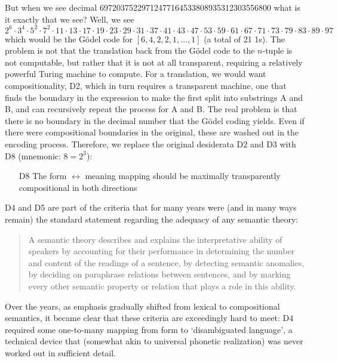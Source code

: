 \documentclass[output=paper,colorlinks=true,citecolor=brown]{langscibook}
\begin{document}
But when we see decimal 69720375229712477164533808935312303556800 what is it
exactly that we see? Well, we see $2^6\cdot 3^4\cdot 5^2\cdot 7^2\cdot 11\cdot
13\cdot 17\cdot 19\cdot 23\cdot 29\cdot 31\cdot 37\cdot 41\cdot 43\cdot
47\cdot 53\cdot 59\cdot 61\cdot 67\cdot 71\cdot 73\cdot 79\cdot 83\cdot
89\cdot 97$ which would be the G\"odel code for $[6,4,2,2,1,\ldots,1]$ (a
total of 21 1s). The problem is not that the translation back from the G\"odel
code to the $n$-tuple is not computable, but rather that it is not at all
transparent, requiring a relatively powerful Turing machine to compute. For a
translation, we would want compositionality, D2, which in turn requires a
transparent machine, one that finds the boundary in the expression to make the
first split into substrings A and B, and can recursively repeat the process
for A and B. The real problem is that there is no boundary in the decimal
number that the G\"odel coding yields. Even if there were compositional
boundaries in the original, these are washed out in the encoding process.
Therefore, we replace the original desiderata D2 and D3 with D8 (mnemonic:
$8=2^3$):

\begin{itemize}
\item[D8] The form $\leftrightarrow$ meaning mapping should be maximally
  transparently compositional in both directions
\end{itemize}

\medskip\noindent D4 and D5 are part of the \citet{Katz:1963} criteria that
for many years were (and in many ways remain) the standard statement regarding
the adequacy of any semantic theory:

\begin{quote}
A semantic theory describes and explains the interpretative ability of
speakers by accounting for their performance in determining the number and
content of the readings of a sentence, by detecting semantic anomalies, by
deciding on paraphrase relations between sentences, and by marking every other
semantic property or relation that plays a role in this ability.
\end{quote}

\noindent 
Over the years, as emphasis gradually shifted from lexical to compositional
semantics, it became clear that these criteria are exceedingly hard to meet:
D4 required some one-to-many mapping from form to `disambiguated language', a
technical device that (somewhat akin to universal phonetic realization) was
never worked out in sufficient detail.
\end{document}
